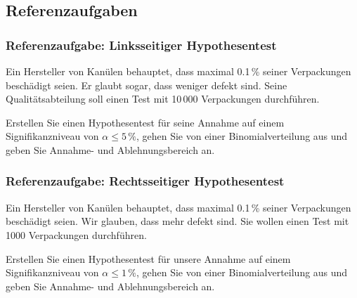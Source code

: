 
\subsection{Referenzaufgaben}
\subsubsection{Referenzaufgabe: Linksseitiger Hypothesentest}

Ein Hersteller von Kanülen behauptet, dass maximal 0.1\,\% seiner
Verpackungen beschädigt seien. Er glaubt sogar, dass weniger defekt
sind.
Seine Qualitätsabteilung soll einen Test mit 10\,000 Verpackungen durchführen.

Erstellen Sie einen Hypothesentest für seine Annahme auf einem
Signifikanzniveau von $\alpha \le 5\,\%$, gehen Sie von einer
Binomialverteilung aus und geben Sie Annahme- und
Ablehnungsbereich an.


\newpage

\subsubsection{Referenzaufgabe: Rechtsseitiger Hypothesentest}
Ein Hersteller von Kanülen behauptet, dass maximal 0.1\,\% seiner
Verpackungen beschädigt seien. Wir glauben, dass mehr defekt sind. Sie wollen einen Test mit 1000 Verpackungen durchführen.

Erstellen Sie einen Hypothesentest für unsere Annahme auf einem
Signifikanzniveau von $\alpha \le 1\,\%$, gehen Sie von einer
Binomialverteilung aus und geben Sie Annahme- und Ablehnungsbereich an.

